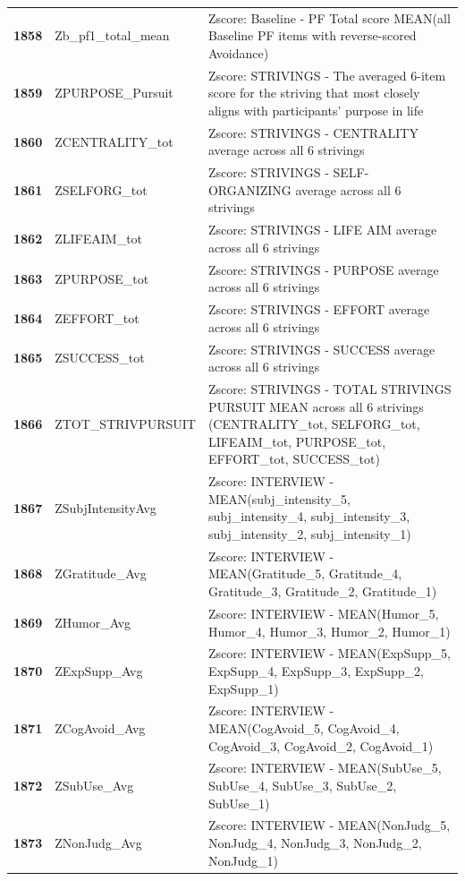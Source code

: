 \documentclass[
  letterpaper,
  DIV=11,
  numbers=noendperiod]{scrartcl}
\begin{document}
\begin{longtable}[t]{>{}cll}
\textbf{1858} & Zb\_pf1\_total\_mean & Zscore:  Baseline - PF Total score MEAN(all Baseline PF items with reverse-scored Avoidance)\\
\textbf{1859} & ZPURPOSE\_Pursuit & Zscore:  STRIVINGS - The averaged 6-item score for the striving that most closely aligns with participants' purpose in life\\
\textbf{1860} & ZCENTRALITY\_tot & Zscore:  STRIVINGS - CENTRALITY average across all 6 strivings\\
\addlinespace
\textbf{1861} & ZSELFORG\_tot & Zscore:  STRIVINGS - SELF-ORGANIZING average across all 6 strivings\\
\textbf{1862} & ZLIFEAIM\_tot & Zscore:  STRIVINGS - LIFE AIM average across all 6 strivings\\
\textbf{1863} & ZPURPOSE\_tot & Zscore:  STRIVINGS - PURPOSE average across all 6 strivings\\
\textbf{1864} & ZEFFORT\_tot & Zscore:  STRIVINGS - EFFORT average across all 6 strivings\\
\textbf{1865} & ZSUCCESS\_tot & Zscore:  STRIVINGS - SUCCESS average across all 6 strivings\\
\addlinespace
\textbf{1866} & ZTOT\_STRIVPURSUIT & Zscore:  STRIVINGS - TOTAL STRIVINGS PURSUIT MEAN across all 6 strivings (CENTRALITY\_tot, SELFORG\_tot, LIFEAIM\_tot, PURPOSE\_tot, EFFORT\_tot, SUCCESS\_tot)\\
\textbf{1867} & ZSubjIntensityAvg & Zscore:  INTERVIEW - MEAN(subj\_intensity\_5, subj\_intensity\_4, subj\_intensity\_3, subj\_intensity\_2, subj\_intensity\_1)\\
\textbf{1868} & ZGratitude\_Avg & Zscore:  INTERVIEW - MEAN(Gratitude\_5, Gratitude\_4, Gratitude\_3, Gratitude\_2, Gratitude\_1)\\
\textbf{1869} & ZHumor\_Avg & Zscore:  INTERVIEW - MEAN(Humor\_5, Humor\_4, Humor\_3, Humor\_2, Humor\_1)\\
\textbf{1870} & ZExpSupp\_Avg & Zscore:  INTERVIEW - MEAN(ExpSupp\_5, ExpSupp\_4, ExpSupp\_3, ExpSupp\_2, ExpSupp\_1)\\
\addlinespace
\textbf{1871} & ZCogAvoid\_Avg & Zscore:  INTERVIEW - MEAN(CogAvoid\_5, CogAvoid\_4, CogAvoid\_3, CogAvoid\_2, CogAvoid\_1)\\
\textbf{1872} & ZSubUse\_Avg & Zscore:  INTERVIEW - MEAN(SubUse\_5, SubUse\_4, SubUse\_3, SubUse\_2, SubUse\_1)\\
\textbf{1873} & ZNonJudg\_Avg & Zscore:  INTERVIEW - MEAN(NonJudg\_5, NonJudg\_4, NonJudg\_3, NonJudg\_2, NonJudg\_1)\\

\end{longtable}
\end{document}
